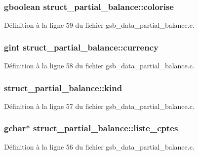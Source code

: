 \subsubsection[{colorise}]{\setlength{\rightskip}{0pt plus 5cm}gboolean {\bf struct\_\-partial\_\-balance::colorise}}\label{structstruct__partial__balance_a1face633b63e766669f063bf4305f6c9}


Définition à la ligne 59 du fichier gsb\_\-data\_\-partial\_\-balance.c.

\subsubsection[{currency}]{\setlength{\rightskip}{0pt plus 5cm}gint {\bf struct\_\-partial\_\-balance::currency}}\label{structstruct__partial__balance_a61f9aca58e8d648c8185a4d9d21e3ed6}


Définition à la ligne 58 du fichier gsb\_\-data\_\-partial\_\-balance.c.

\subsubsection[{kind}]{ {\bf struct\_\-partial\_\-balance::kind}}\label{structstruct__partial__balance_ae0c0c6711056db570185fa5e2cb247ad}


Définition à la ligne 57 du fichier gsb\_\-data\_\-partial\_\-balance.c.

\subsubsection[{liste\_\-cptes}]{\setlength{\rightskip}{0pt plus 5cm}gchar$\ast$ {\bf struct\_\-partial\_\-balance::liste\_\-cptes}}\label{structstruct__partial__balance_ae3f3113f408fde0380e282933115f776}


Définition à la ligne 56 du fichier gsb\_\-data\_\-partial\_\-balance.c.

